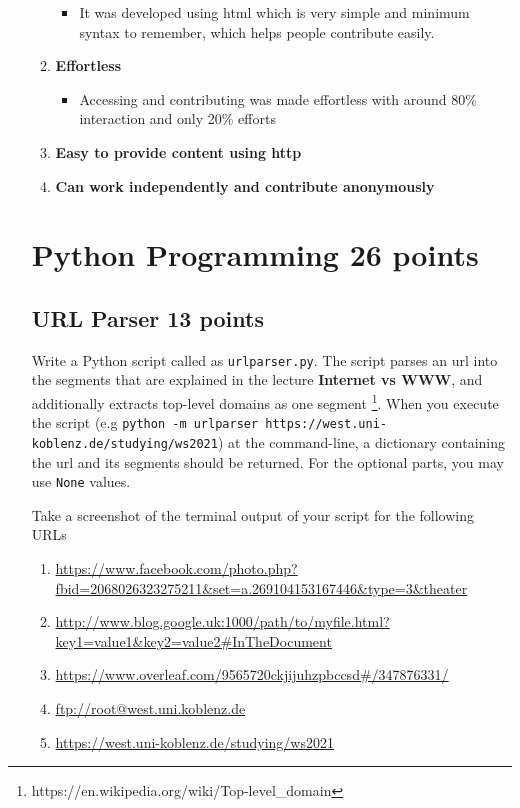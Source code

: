 \documentclass{resources/WeSTassignment}
\begin{document}
\begin{enumerate}
\begin{enumerate}
	\begin{itemize}
    		\item It was developed using html which is very simple and minimum syntax to remember, which helps people contribute easily.
	\end{itemize}
    \item \textbf{Effortless}
	\begin{itemize}
    		\item Accessing and contributing was made effortless with around 80\% interaction and only 20\% efforts
	\end{itemize}
    \item \textbf{Easy to provide content using http}
    \item \textbf{Can work independently and contribute anonymously}
\end{enumerate}


\section{Python Programming \hfill{26 points}}
\subsection{URL Parser \hfill{13 points}\label{url_parser}}
Write a Python script called as \texttt{urlparser.py}. The script parses an url into the segments that are explained in the lecture \textbf{Internet vs WWW}, and additionally extracts top-level domains as one segment \footnote{https://en.wikipedia.org/wiki/Top-level\_domain}. When you execute the script (e.g \texttt{python -m urlparser https://west.uni-koblenz.de/studying/ws2021}) at the command-line, a dictionary containing the url and its segments should be returned. For the optional parts, you may use \texttt{None} values. 

Take a screenshot of the terminal output of your script for the following URLs
\begin{enumerate}
    \item \url{https://www.facebook.com/photo.php?fbid=2068026323275211&set=a.269104153167446&type=3&theater}
    \item \url{http://www.blog.google.uk:1000/path/to/myfile.html?key1=value1&key2=value2#InTheDocument}
    \item \url{https://www.overleaf.com/9565720ckjijuhzpbccsd#/347876331/}
    \item \url{ftp://root@west.uni.koblenz.de}
    \item \url{https://west.uni-koblenz.de/studying/ws2021}
    

\end{enumerate}
\end{enumerate}
\end{document}

